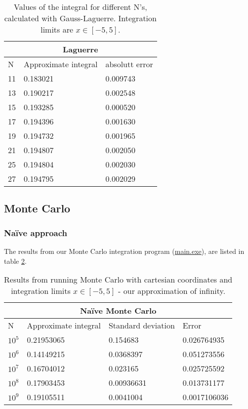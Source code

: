 \documentclass[../main.tex]{subfiles}
\begin{document}
\begin{table}[h!]
\begin{center}
\begin{tabular}{ |p{1cm}|p{4cm}|p{3cm}|}
 \hline
 \multicolumn{3}{|c|}{\textbf{Laguerre}} \\
 \hline
       N   & Approximate integral & absolutt error\\
 \hline
 11 &  0.183021 &  0.009743\\
 13 &  0.190217 &  0.002548\\
 15 &  0.193285 &  0.000520\\
 17 &  0.194396 &  0.001630\\
 19 &  0.194732 &  0.001965\\
 21 &  0.194807 &  0.002050\\
 25 &  0.194804 &  0.002030\\
 27 &  0.194795 &  0.002029\\

 \hline
\end{tabular}
\caption{Values of the integral for different N's, calculated with Gauss-Laguerre. Integration limits are $x\in[-5,5]$.}
\label{tab:res-gaulag}
\end{center}
\end{table}

\FloatBarrier

\subsection{Monte Carlo}
\subsubsection{Naïve approach}
The results from our Monte Carlo integration program (\href{https://github.com/kmaasrud/Project-3/blob/master/code/Monte-Carlo/main.exe}{main.exe}), are listed in table \ref{tab:res-naive}.

\begin{table}[h!]
  \begin{center}
    \begin{tabular}{|p{1cm}|p{3.5cm}|p{3cm}|p{3cm}|}
     \hline
     \multicolumn{4}{|c|}{\textbf{Naïve Monte Carlo}} \\
     \hline
           N   & Approximate integral & Standard deviation & Error\\
     \hline
     $10^5$ &  0.21953065 &  0.154683 & 0.026764935\\
     $10^6$ &  0.14149215 &  0.0368397 & 0.051273556\\
     $10^7$ &  0.16704012 &  0.023165 & 0.025725592\\
     $10^8$ &  0.17903453 &  0.00936631 & 0.013731177\\
     $10^9$ &  0.19105511 &  0.0041004 & 0.0017106036\\

     \hline
    \end{tabular}
    \caption{Results from running Monte Carlo with cartesian coordinates and integration limits $x\in[-5,5]$ - our approximation of infinity.}
    \label{tab:res-naive}
  \end{center}
\end{table}
\end{document}
